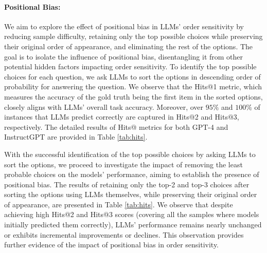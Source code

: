 \documentclass[11pt]{article}
\begin{document}


\paragraph{Positional Bias:}  
We aim to explore the effect of positional bias in LLMs' order sensitivity by reducing sample difficulty, retaining only the top possible choices while preserving their original order of appearance, and eliminating the rest of the options. 
The goal is to isolate the influence of positional bias, disentangling it from other potential hidden factors impacting order sensitivity. 
To identify the top possible choices for each question, we ask LLMs to sort the options in descending order of probability for answering the question. 
We observe that the Hits@1 metric, which measures the accuracy of the gold truth being the first item in the sorted options, closely aligns with LLMs' overall task accuracy. 
Moreover, over $95\%$ and $100\%$ of instances that LLMs predict correctly are captured in Hits@2 and Hits@3, respectively. 
The detailed results of Hits@ metrics for both GPT-4 and InstructGPT are provided in Table \ref{tab:hits}.

With the successful identification of the top possible choices by asking LLMs to sort the options, we proceed to investigate the impact of removing the least probable choices on the models' performance, aiming to establish the presence of positional bias. 
The results of retaining only the top-2 and top-3 choices after sorting the options using LLMs themselves, while preserving their original order of appearance, are presented in Table \ref{tab:hits}. 
We observe that despite achieving high Hits@2 and Hits@3 scores (covering all the samples where models initially predicted them correctly), LLMs' performance remains nearly unchanged or exhibits incremental improvements or declines. 
This observation provides further evidence of the impact of positional bias in order sensitivity.
\end{document}
